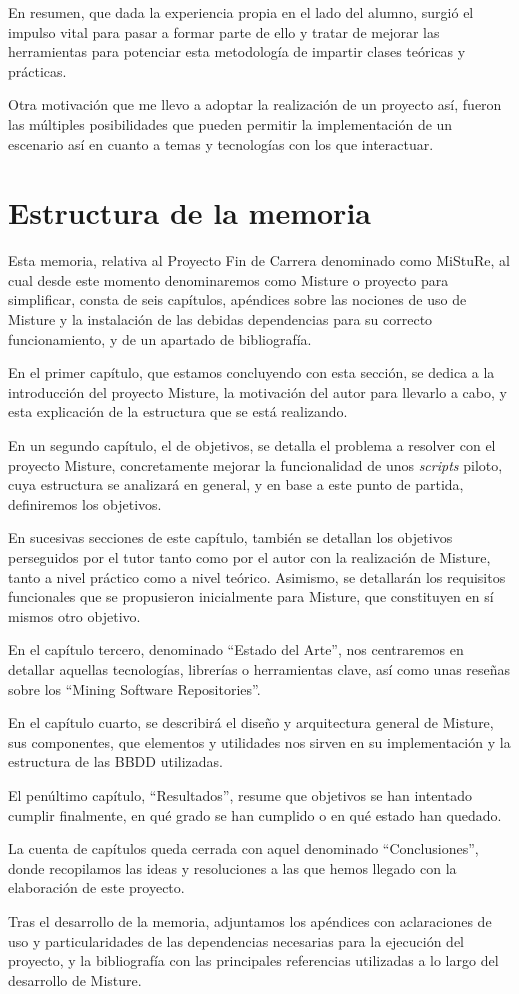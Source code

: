 En resumen, que dada la experiencia propia en el lado del alumno, surgió el impulso vital para pasar a formar parte de ello y tratar de mejorar las herramientas para potenciar esta metodología de impartir clases teóricas y prácticas.


Otra motivación que me llevo a adoptar la realización de un proyecto así, fueron las múltiples posibilidades que pueden permitir la implementación de un escenario así en cuanto a temas y tecnologías con los que interactuar.


\section{Estructura de la memoria}

Esta memoria, relativa al Proyecto Fin de Carrera denominado como MiStuRe, al cual desde este momento denominaremos como Misture o proyecto para simplificar, consta de seis capítulos, apéndices sobre las nociones de uso de Misture y la instalación de las debidas dependencias para su correcto funcionamiento, y de un apartado de bibliografía.


En el primer capítulo, que estamos concluyendo con esta sección, se dedica a la introducción del proyecto Misture, la motivación del autor para llevarlo a cabo, y esta explicación de la estructura que se está realizando.


En un segundo capítulo, el de objetivos, se detalla el problema a resolver con el proyecto Misture, concretamente mejorar la funcionalidad de unos \textit{scripts} piloto, cuya estructura se analizará en general, y en base a este punto de partida, definiremos los objetivos.


En sucesivas secciones de este capítulo, también se detallan los objetivos perseguidos por el tutor tanto como por el autor con la realización de Misture, tanto a nivel práctico como a nivel teórico. Asimismo, se detallarán los requisitos funcionales que se propusieron inicialmente para Misture, que constituyen en sí mismos otro objetivo.


En el capítulo tercero, denominado ``Estado del Arte'', nos centraremos en detallar aquellas tecnologías, librerías o herramientas clave, así como unas reseñas sobre los ``Mining Software Repositories''.


En el capítulo cuarto, se describirá el diseño y arquitectura general de Misture, sus componentes, que elementos y utilidades nos sirven en su implementación y la estructura de las BBDD utilizadas.


El penúltimo capítulo, ``Resultados'', resume que objetivos se han intentado cumplir finalmente, en qué grado se han cumplido o en qué estado han quedado.


La cuenta de capítulos queda cerrada con aquel denominado ``Conclusiones'', donde recopilamos las ideas y resoluciones a las que hemos llegado con la elaboración de este proyecto.


Tras el desarrollo de la memoria, adjuntamos los apéndices con aclaraciones de uso y particularidades de las dependencias necesarias para la ejecución del proyecto, y la bibliografía con las principales referencias utilizadas a lo largo del desarrollo de Misture.


